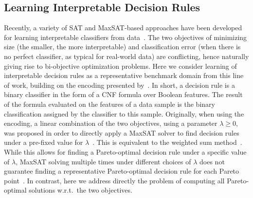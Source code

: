 \subsection{Learning Interpretable Decision Rules\label{sec:lidr}}

Recently, a variety of SAT and MaxSAT-based approaches have been developed for learning interpretable classifiers from data~\autocites{DBLP:conf/ijcai/Ignatiev0NS21,DBLP:conf/cp/MaliotovM18,DBLP:conf/ijcai/NarodytskaIPM18,DBLP:conf/ijcai/Hu0HH20,DBLP:journals/corr/abs-2010-09919,DBLP:conf/cp/YuISB20,DBLP:conf/cade/IgnatievPNM18}.
The two objectives of minimizing size (the smaller, the more interpretable) and classification error (when there is no perfect classifier, as typical for real-world data) are conflicting, hence naturally giving rise to bi-objective optimization problems.
Here we consider learning of interpretable decision rules as a representative benchmark domain from this line of work, building on the encoding presented by~\textcite{DBLP:conf/cp/MaliotovM18}.
In short, a decision rule is a binary classifier in the form of a CNF formula over Boolean features.
The result of the formula evaluated on the features of a data sample is the binary classification assigned by the classifier to this sample.
Originally, when using the encoding, a linear combination of the two objectives, using a parameter $\lambda\geq 0$, was proposed in order to directly apply a MaxSAT solver to find decision rules under a pre-fixed value for $\lambda$~\autocite{DBLP:conf/cp/MaliotovM18}.
This is equivalent to the weighted sum method~\autocite{Ehrgott2005-3}.
While this allows for finding a Pareto-optimal decision rule under a specific value of $\lambda$, MaxSAT solving multiple times under different choices of $\lambda$ does not guarantee finding a representative Pareto-optimal decision rule for each Pareto point~\autocites{Ehrgott2005-3,survey}.
In contrast, here we address directly the problem of computing all Pareto-optimal solutions w.r.t.\ the two objectives.
\bigskip

